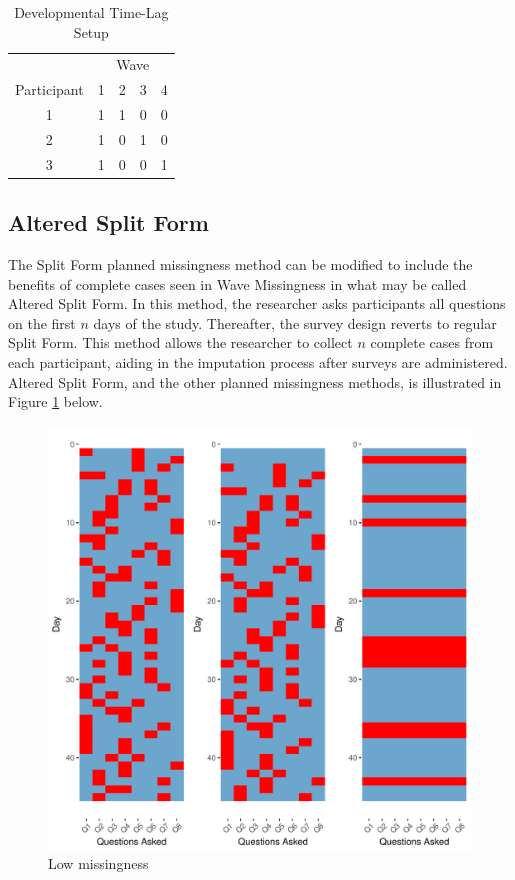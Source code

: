 \documentclass{svjour3}\usepackage[]{graphicx}\usepackage[]{color}
\makeatletter
\def\maxwidth{ %
  \ifdim\Gin@nat@width>\linewidth
    \linewidth
  \else
    \Gin@nat@width
  \fi
}
\newenvironment{knitrout}{}{} %
\makeatother
\begin{document}
\begin{table}[H]
	\centering
	\caption{Developmental Time-Lag Setup}
	\label{tab:devtimelag}
	\setlength{\tabcolsep}{0.75cm}
	\begin{tabular}{c|cccc}
		\toprule
		& \multicolumn{4}{c}{Wave} \\
		Participant & 1 & 2 & 3 & 4 \\
		\midrule
		1 & 1 & 1 & 0 & 0 \\
		2 & 1 & 0 & 1 & 0 \\
		3 & 1 & 0 & 0 & 1 \\
		\bottomrule
	\end{tabular}
\end{table}

\subsection{Altered Split Form}

The Split Form planned missingness method can be modified to include the benefits of complete cases seen in Wave Missingness in what may be called Altered Split Form. In this method, the researcher asks participants all questions on the first $n$ days of the study. Thereafter, the survey design reverts to regular Split Form. This method allows the researcher to collect $n$ complete cases from each participant, aiding in the imputation process after surveys are administered. Altered Split Form, and the other planned missingness methods, is illustrated in Figure \ref{fig:formillustration} below.

\begin{knitrout}
\color{fgcolor}\begin{figure}[H]
\includegraphics[width=\maxwidth]{figure/formillustration-1} \caption[Low missingness]{Low missingness}\label{fig:formillustration}
\end{figure}


\end{knitrout}
\end{document}
